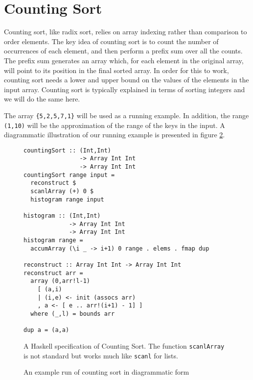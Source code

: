 \section{Counting Sort}
\label{sec:algorithm}

Counting sort, like radix sort, relies on array indexing rather than
comparison to order elements. The key idea of counting sort is to
count the number of occurrences of each element, and then perform a
prefix sum over all the counts. The prefix sum generates an array
which, for each element in the original array, will point to its
position in the final sorted array. In order for this to work,
counting sort needs a lower and upper bound on the values of the
elements in the input array. Counting sort is typically explained in
terms of sorting integers and we will do the same here.

The array \verb!{5,2,5,7,1}! will be used as a running example. In
addition, the range \verb!(1,10)! will be the approximation of the
range of the keys in the input. A diagrammatic illustration of our
running example is presented in figure \ref{fig:example}.

\begin{figure}
\begin{small} 
\begin{verbatim}
countingSort :: (Int,Int) 
                -> Array Int Int 
                -> Array Int Int
countingSort range input =
  reconstruct $
  scanlArray (+) 0 $
  histogram range input

histogram :: (Int,Int) 
             -> Array Int Int 
             -> Array Int Int
histogram range = 
  accumArray (\i _ -> i+1) 0 range . elems . fmap dup

reconstruct :: Array Int Int -> Array Int Int
reconstruct arr = 
  array (0,arr!l-1)
    [ (a,i)
    | (i,e) <- init (assocs arr)
    , a <- [ e .. arr!(i+1) - 1] ]
  where (_,l) = bounds arr

dup a = (a,a)
\end{verbatim}
\end{small}
\caption{A Haskell specification of Counting Sort. The function
  \texttt{scanlArray} is not standard but works much like
  \texttt{scanl}
  for lists.}
\label{fig:haskell}
\end{figure}

\begin{figure}

\caption{An example run of counting sort in diagrammatic form}
\label{fig:example}
\end{figure}
 
